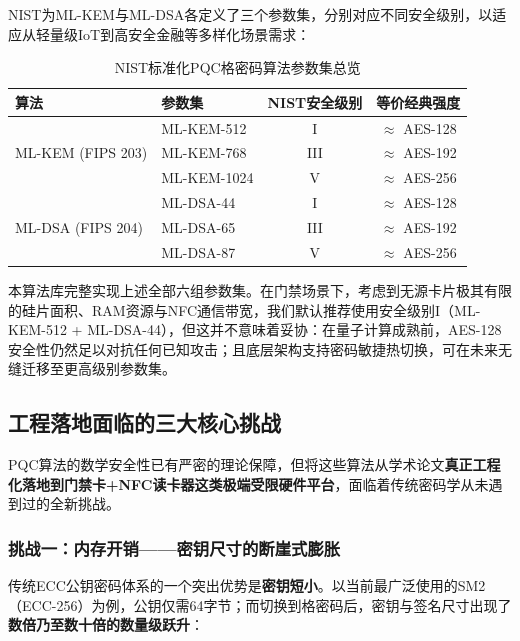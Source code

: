 NIST为ML-KEM与ML-DSA各定义了三个参数集，分别对应不同安全级别，以适应从轻量级IoT到高安全金融等多样化场景需求：

\begin{table}[htbp]
	\centering
	\caption{NIST标准化PQC格密码算法参数集总览}
	\label{tab:pqc_params}
	\renewcommand{\arraystretch}{1.3}
	\begin{tabular}{llcc}
		\toprule
		\textbf{算法} & \textbf{参数集} & \textbf{NIST安全级别} & \textbf{等价经典强度} \\
		\midrule
		\multirow{3}{*}{ML-KEM (FIPS 203)}  & ML-KEM-512  & I   & $\approx$ AES-128 \\
		                                     & ML-KEM-768  & III & $\approx$ AES-192 \\
		                                     & ML-KEM-1024 & V   & $\approx$ AES-256 \\
		\midrule
		\multirow{3}{*}{ML-DSA (FIPS 204)}  & ML-DSA-44   & I   & $\approx$ AES-128 \\
		                                     & ML-DSA-65   & III & $\approx$ AES-192 \\
		                                     & ML-DSA-87   & V   & $\approx$ AES-256 \\
		\bottomrule
	\end{tabular}
\end{table}

本算法库完整实现上述全部六组参数集。在门禁场景下，考虑到无源卡片极其有限的硅片面积、RAM资源与NFC通信带宽，我们默认推荐使用安全级别I（ML-KEM-512 + ML-DSA-44），但这并不意味着妥协：在量子计算成熟前，AES-128安全性仍然足以对抗任何已知攻击；且底层架构支持密码敏捷热切换，可在未来无缝迁移至更高级别参数集。

\subsection{工程落地面临的三大核心挑战}

PQC算法的数学安全性已有严密的理论保障，但将这些算法从学术论文\textbf{真正工程化落地到门禁卡+NFC读卡器这类极端受限硬件平台}，面临着传统密码学从未遇到过的全新挑战。

\subsubsection{挑战一：内存开销——密钥尺寸的断崖式膨胀}

传统ECC公钥密码体系的一个突出优势是\textbf{密钥短小}。以当前最广泛使用的SM2（ECC-256）为例，公钥仅需64字节；而切换到格密码后，密钥与签名尺寸出现了\textbf{数倍乃至数十倍的数量级跃升}：

